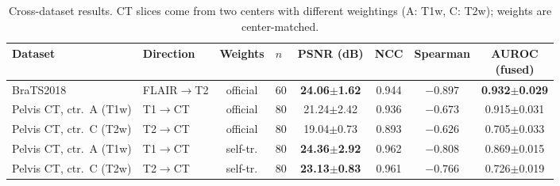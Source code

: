 \begin{table}[htbp]
\centering\footnotesize\setlength{\tabcolsep}{4pt}
\caption{Cross-dataset results. CT slices come from two centers with
different weightings (A: T1w, C: T2w); weights are center-matched.}
\label{tab:cross_en}
\begin{tabular}{llclcccc}
\toprule
Dataset & Direction & Weights & $n$ & PSNR (dB) & NCC & Spearman & \makecell{AUROC\\(fused)} \\
\midrule
BraTS2018 & FLAIR$\to$T2 & official & 60 & \textbf{24.06$\pm$1.62} & 0.944 & $-0.897$ & \textbf{0.932$\pm$0.029} \\
Pelvis CT, ctr.\ A (T1w) & T1$\to$CT & official & 80 & 21.24$\pm$2.42 & 0.936 & $-0.673$ & 0.915$\pm$0.031 \\
Pelvis CT, ctr.\ C (T2w) & T2$\to$CT & official & 80 & 19.04$\pm$0.73 & 0.893 & $-0.626$ & 0.705$\pm$0.033 \\
Pelvis CT, ctr.\ A (T1w) & T1$\to$CT & self-tr. & 80 & \textbf{24.36$\pm$2.92} & 0.962 & $-0.808$ & 0.869$\pm$0.015 \\
Pelvis CT, ctr.\ C (T2w) & T2$\to$CT & self-tr. & 80 & \textbf{23.13$\pm$0.83} & 0.961 & $-0.766$ & 0.726$\pm$0.019 \\
\bottomrule
\end{tabular}
\end{table}

